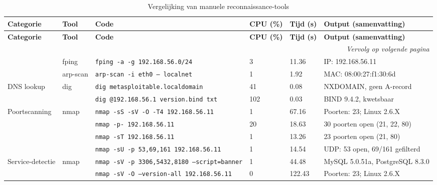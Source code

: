 \chapter{}%
\label{app:manueel}
{\small
\begin{landscape}
\selectfont
\setlength{\tabcolsep}{1.5pt}
\begin{longtable}{lllp{2cm}p{1.2cm}p{4cm}}
\caption{Vergelijking van manuele reconnaissance-tools} \label{tab:vergelijking-recon-manueel} \\
\toprule
\textbf{Categorie} & \textbf{Tool} & \textbf{Code} & \textbf{CPU (\%)} & \textbf{Tijd (s)} & \textbf{Output (samenvatting)} \\
\midrule
\endfirsthead
\toprule
\textbf{Categorie} & \textbf{Tool} & \textbf{Code} & \textbf{CPU (\%)} & \textbf{Tijd (s)} & \textbf{Output (samenvatting)} \\
\midrule
\endhead
\midrule
\multicolumn{6}{r}{\textit{Vervolg op volgende pagina}} \\
\endfoot
\bottomrule
\endlastfoot
\multirow{2}{*}{Host discovery} & fping & \texttt{fping -a -g 192.168.56.0/24} & 3 & 11.36 & IP: 192.168.56.11 \\
 & arp-scan & \texttt{arp-scan -i eth0 -- localnet} & 1 & 1.92 & MAC: 08:00:27:f1:30:6d \\
\multirow{2}{*}{DNS lookup} & \multirow{2}{*}{dig} & \texttt{dig metasploitable.localdomain} & 41 & 0.08 & NXDOMAIN, geen A-record \\
 & & \texttt{dig @192.168.56.1 version.bind txt} & 102 & 0.03 & BIND 9.4.2, kwetsbaar \\
\multirow{4}{*}{Poortscanning} & \multirow{3}{*}{nmap} & \texttt{nmap -sS -sV -O -T4 192.168.56.11} & 1 & 67.16 & Poorten: 23; Linux 2.6.X \\
 & & \texttt{nmap -p- 192.168.56.11} & 20 & 18.63 & 30 poorten open (21, 22, 80) \\
 & & \texttt{nmap -sT 192.168.56.11} & 1 & 13.26 & 23 poorten open (21, 80) \\
 & & \texttt{nmap -sU -p 53,69,161 192.168.56.11} & 1 & 14.54 & UDP: 53 open, 69/161 gefilterd \\
\multirow{4}{*}{Service-detectie} & \multirow{2}{*}{nmap} & \texttt{nmap -sV -p 3306,5432,8180 --script=banner} & 1 & 44.48 & MySQL 5.0.51a, PostgreSQL 8.3.0 \\
 & & \texttt{nmap -sV -O --version-all 192.168.56.11} & 0 & 122.43 & Poorten: 23; Linux 2.6.X \\

\end{longtable}
\end{landscape}}
